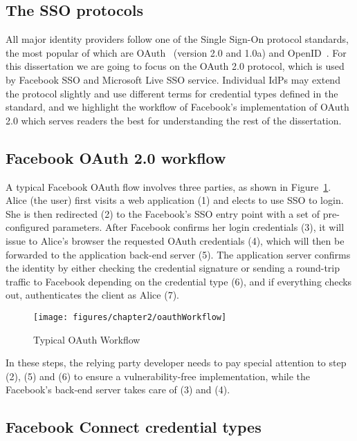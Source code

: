 \subsection{The SSO protocols}
\label{sec:bgSSOProtocol}
All major identity providers follow one of the Single Sign-On protocol standards, the most popular of which are OAuth~\cite{OAuth2.0} (version 2.0 and 1.0a) and OpenID~\cite{openID}.  For this dissertation we are going to focus on the OAuth 2.0 protocol, which is used by Facebook SSO and Microsoft Live SSO service.  Individual IdPs may extend the protocol slightly and use different terms for credential types defined in the standard, and we highlight the workflow of Facebook's implementation of OAuth 2.0 which serves readers the best for understanding the rest of the dissertation.

\subsection{Facebook OAuth 2.0 workflow}

A typical Facebook OAuth flow involves three parties, as shown in Figure~\ref{fig:oauthWorkflow}.  Alice (the user) first visits a web application (1) and elects to use SSO to login.  She is then redirected (2) to the Facebook's SSO entry point with a set of pre-configured parameters.  After Facebook confirms her login credentials (3), it will issue to Alice's browser the requested OAuth credentials (4), which will then be forwarded to the application back-end server (5).  The application server confirms the identity by either checking the credential signature or sending a round-trip traffic to Facebook depending on the credential type (6), and if everything checks out, authenticates the client as Alice (7).

\begin{figure}[bth]
\centering
\texttt{[image: figures/chapter2/oauthWorkflow]}
\caption{Typical OAuth Workflow}
\label{fig:oauthWorkflow}
\end{figure}

In these steps, the relying party developer needs to pay special attention to step (2), (5) and (6) to ensure a vulnerability-free implementation, while the Facebook's back-end server takes care of (3) and (4).

\subsection{Facebook Connect credential types}

